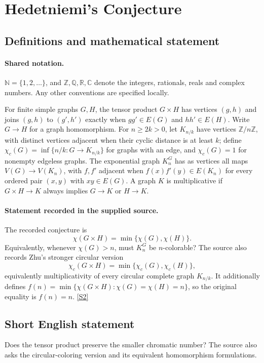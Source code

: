 \documentclass[11pt]{article}
\newcommand{\sref}[2]{\hyperlink{source:#1:#2}{[S#2]}}
\begin{document}
\section{Hedetniemi's Conjecture}\label{statement}

\subsection{Definitions and mathematical statement}

\paragraph{Shared notation.}$\mathbb N=\{1,2,\ldots\}$, and $\mathbb Z,\mathbb Q,\mathbb R,\mathbb C$ denote the integers, rationals, reals and complex numbers. Any other conventions are specified locally.


For finite simple graphs $G,H$, the tensor product $G\times H$ has vertices $(g,h)$ and joins $(g,h)$ to $(g',h')$ exactly when $gg'\in E(G)$ and $hh'\in E(H)$. Write $G\to H$ for a graph homomorphism. For $n\ge2k>0$, let $K_{n/k}$ have vertices $\mathbb Z/n\mathbb Z$, with distinct vertices adjacent when their cyclic distance is at least $k$; define $\chi_c(G)=\inf\{n/k:G\to K_{n/k}\}$ for graphs with an edge, and $\chi_c(G)=1$ for nonempty edgeless graphs. The exponential graph $K_n^G$ has as vertices all maps $V(G)\to V(K_n)$, with $f,f'$ adjacent when $f(x)f'(y)\in E(K_n)$ for every ordered pair $(x,y)$ with $xy\in E(G)$. A graph $K$ is multiplicative if $G\times H\to K$ always implies $G\to K$ or $H\to K$.
\paragraph{Statement recorded in the supplied source.}
The recorded conjecture is \[\chi(G\times H)=\min\{\chi(G),\chi(H)\}.\] Equivalently, whenever $\chi(G)>n$, must $K_n^G$ be $n$-colorable? The source also records Zhu's stronger circular version \[\chi_c(G\times H)=\min\{\chi_c(G),\chi_c(H)\},\] equivalently multiplicativity of every circular complete graph $K_{n/k}$. It additionally defines $f(n)=\min\{\chi(G\times H):\chi(G)=\chi(H)=n\}$, so the original equality is $f(n)=n$. \sref{statement}{2}
\subsection{Short English statement}
Does the tensor product preserve the smaller chromatic number? The source also asks the circular-coloring version and its equivalent homomorphism formulations.
\end{document}
